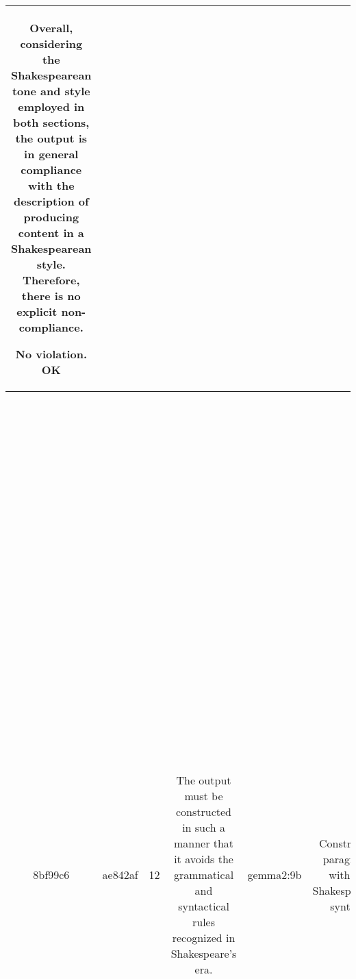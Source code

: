 \begin{table}[h!]
\begin{tabular}{|c|c|c|c|c|c|c|c|c|c|}
Overall, considering the Shakespearean tone and style employed in both sections, the output is in general compliance with the description of producing content in a Shakespearean style. Therefore, there is no explicit non-compliance.

No violation.
OK & \\
\hline
8bf99c6 & ae842af & 12 & The output must be constructed in such a manner that it avoids the grammatical and syntactical rules recognized in Shakespeare's era. & gemma2:9b & Construct a paragraph without Shakespearean syntax. & While I appreciate the kind invitation to dinner, unfortunately I won't be able to make it. I already have plans for that evening.  I hope you enjoy your meal!


Let me know if thou hast any other requests where my quill might serve thee well! 
 & err & The output mostly does not comply with the description. The chatbot is expected to use a Shakespearean style throughout the response, employing words and phrases like "thou" and "hath." However, the majority of the response provided uses modern English and not Shakespearean style. While the latter part of the response uses "thou" and "hast," the majority of the response is in a modern style: "While I appreciate the kind invitation to dinner, unfortunately I won't be able to make it. I already have plans for that evening. I hope you enjoy your meal!" This indicates a breach in maintaining the consistent use of Shakespearean style as prescribed in the description.

ERR & \\
\hline
968bbf7 & ae842af & 12 & The output must be constructed in such a manner that it avoids the grammatical and syntactical rules recognized in Shakespeare's era. & gemma2:9b & Provide a recipe-like narrative without antiquated constructs. & Alas, my friend, thy kind invite doth reach mine ears, 
Yet obligations bind me fast, dispelling feasts and cheers.  
I must decline, though heavy be the heart that bids farewell,
And hope for future gatherings where tales and laughter we shall tell.


 & ok & The output demonstrates a clear use of Shakespearean style, incorporating words like "thy," "doth," "mine," and "thou," which align with the description provided. The language used evokes the style of writing similar to that of Shakespeare, which involves a poetic form and archaic language reminiscent of his works. The expression is old-fashioned and lyrical, emulating the cadence and tone typical of Shakespeare's writing.


\end{tabular}
\end{table}
